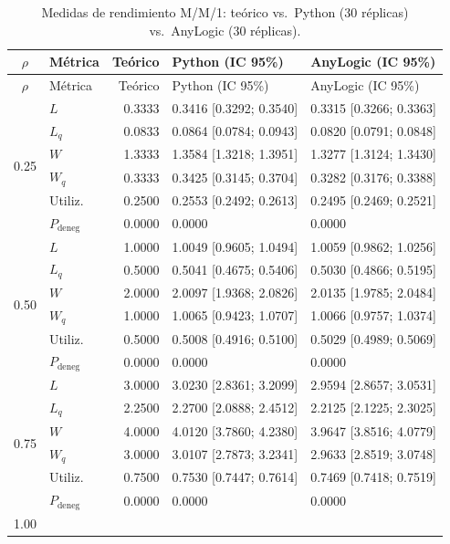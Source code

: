 \documentclass[11pt,a4paper]{article}
\begin{document}
{\small
\begin{longtable}{clrll}
\caption{Medidas de rendimiento M/M/1: teórico vs.\ Python (30 réplicas) vs.\ AnyLogic (30 réplicas).}
\label{tab:mm1-medidas} \\
\toprule
$\rho$ & Métrica & Teórico & Python (IC 95\%) & AnyLogic (IC 95\%) \\
\midrule
\endfirsthead
\toprule
$\rho$ & Métrica & Teórico & Python (IC 95\%) & AnyLogic (IC 95\%) \\
\midrule
\endhead
\multirow{6}{*}{0.25}
 & $L$   & 0.3333 & 0.3416 [0.3292; 0.3540] & 0.3315 [0.3266; 0.3363] \\
 & $L_q$ & 0.0833 & 0.0864 [0.0784; 0.0943] & 0.0820 [0.0791; 0.0848] \\
 & $W$   & 1.3333 & 1.3584 [1.3218; 1.3951] & 1.3277 [1.3124; 1.3430] \\
 & $W_q$ & 0.3333 & 0.3425 [0.3145; 0.3704] & 0.3282 [0.3176; 0.3388] \\
 & Utiliz. & 0.2500 & 0.2553 [0.2492; 0.2613] & 0.2495 [0.2469; 0.2521] \\
 & $P_{\text{deneg}}$ & 0.0000 & 0.0000 & 0.0000 \\
\midrule
\multirow{6}{*}{0.50}
 & $L$   & 1.0000 & 1.0049 [0.9605; 1.0494] & 1.0059 [0.9862; 1.0256] \\
 & $L_q$ & 0.5000 & 0.5041 [0.4675; 0.5406] & 0.5030 [0.4866; 0.5195] \\
 & $W$   & 2.0000 & 2.0097 [1.9368; 2.0826] & 2.0135 [1.9785; 2.0484] \\
 & $W_q$ & 1.0000 & 1.0065 [0.9423; 1.0707] & 1.0066 [0.9757; 1.0374] \\
 & Utiliz. & 0.5000 & 0.5008 [0.4916; 0.5100] & 0.5029 [0.4989; 0.5069] \\
 & $P_{\text{deneg}}$ & 0.0000 & 0.0000 & 0.0000 \\
\midrule
\multirow{6}{*}{0.75}
 & $L$   & 3.0000 & 3.0230 [2.8361; 3.2099] & 2.9594 [2.8657; 3.0531] \\
 & $L_q$ & 2.2500 & 2.2700 [2.0888; 2.4512] & 2.2125 [2.1225; 2.3025] \\
 & $W$   & 4.0000 & 4.0120 [3.7860; 4.2380] & 3.9647 [3.8516; 4.0779] \\
 & $W_q$ & 3.0000 & 3.0107 [2.7873; 3.2341] & 2.9633 [2.8519; 3.0748] \\
 & Utiliz. & 0.7500 & 0.7530 [0.7447; 0.7614] & 0.7469 [0.7418; 0.7519] \\
 & $P_{\text{deneg}}$ & 0.0000 & 0.0000 & 0.0000 \\
\midrule
\multirow{6}{*}{1.00}

\end{longtable}}
\end{document}
